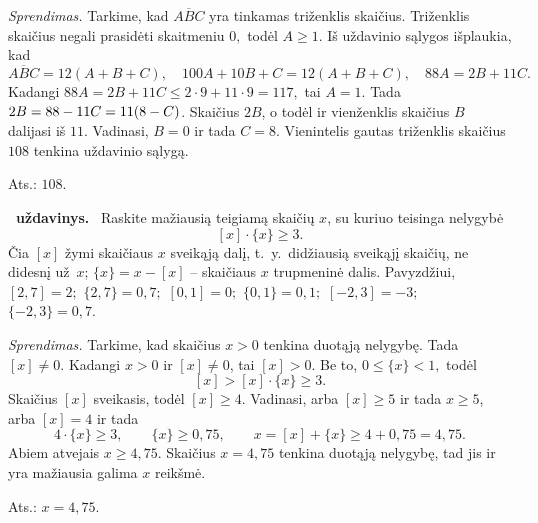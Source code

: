 \documentclass[11pt,a4paper]{article}
\newcommand{\hm}[1]{\nobreak\hspace{0pt}#1\nobreak\hspace{0pt}}
\newcounter{uzdavinys}
\newenvironment{uzdavinys}
  {\refstepcounter{uzdavinys}\par\medskip\noindent\textbf{\theuzdavinys\ uždavinys.}\ }
  {\par\medskip}
\begin{document}
\textit{Sprendimas.} 
Tarkime, kad $\overline{ABC}$ yra tinkamas triženklis skaičius. Triženklis skaičius negali prasidėti skaitmeniu $0,$ todėl $A\geq 1.$ Iš uždavinio sąlygos išplaukia, kad 
\[
\overline{ABC}=12(A+B+C),\quad100A+10B+C=12(A+B+C),\quad 88A=2B+11C.
\] 
Kadangi $88A=2B+11C\leq 2\cdot 9 + 11\cdot 9 =117,$ tai $A=1.$ Tada $2B=88-11C\hm=11(8-C)$. Skaičius $2B$, o todėl ir vienženklis skaičius $B$ dalijasi iš $11.$ Vadinasi, $B=0$ ir tada $C=8.$ Vienintelis gautas triženklis skaičius $108$ tenkina uždavinio sąlygą.
    \begin{flushright}
     Ats.: $108.$
    \end{flushright}
\vspace{3mm}


\begin{uzdavinys} 
Raskite mažiausią teigiamą skaičių $x$, su kuriuo teisinga nelygybė
    \[
    [x]\cdot \{ x\} \geq 3.
    \]
    Čia $[x]$ žymi skaičiaus $x$ sveikąją dalį, t.~y.~didžiausią sveikąjį skaičių,
     ne didesnį už~$x$; $\{ x\}=x - [x]$ -- skaičiaus $x$ trupmeninė dalis. Pavyzdžiui,
     $[2,\! 7]=2;$ $\{2,\! 7\}=0,\! 7;$ $[0,\! 1]=0;$ $\{0,\! 1\}=0,\! 1;$ $[-2,\! 3]=-3;$ $\{-2,\! 3\}=0,\! 7.$
\end{uzdavinys}

\textit{Sprendimas.} 
Tarkime, kad skaičius $x>0$ tenkina duotąją nelygybę. Tada $[x]\neq0$. Kadangi $x>0$ ir $[x]\neq0$, tai $[x]>0.$ Be to, $0\leq \{ x\}<1,$ todėl $$[x]>[x]\cdot\{ x\}\geq 3.$$ Skaičius $[x]$ sveikasis, todėl $[x]\geq 4$. Vadinasi, arba $[x]\geq5$ ir tada $x\geq5$, arba $[x]=4$ ir tada $$4\cdot\{ x\}\geq3,\qquad \{x\}\geq0{,}75,\qquad x=[x]+\{x\}\geq4+0{,}75=4{,}75.$$ Abiem atvejais $x\geq4{,}75$. Skaičius $x=4{,}75$ tenkina duotąją nelygybę, tad jis ir yra mažiausia galima $x$ reikšmė.
    \begin{flushright}
     Ats.: $x=4{,}75.$
    \end{flushright}


\vspace{0,7cm}
\end{document}
